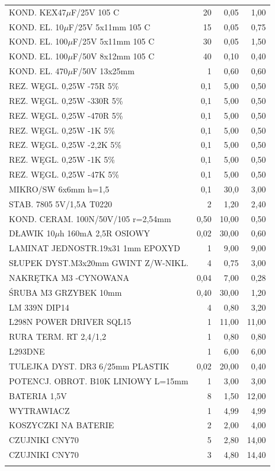 \documentclass[11pt,a4paper]{article}
\begin{document}
\begin{longtable}{|l|r|r|r|}
  KOND. KEX47$\mu$F/25V 105 C & 20 & 0,05 & 1,00 \\
  KOND. EL. 10$\mu$F/25V 5x11mm 105 C & 15 & 0,05 & 0,75 \\
  KOND. EL. 100$\mu$F/25V 5x11mm 105 C & 30 & 0,05 & 1,50 \\   
  KOND. EL. 100$\mu$F/50V 8x12mm 105 C & 40 & 0,10 & 0,40 \\ 
  KOND. EL. 470$\mu$F/50V 13x25mm & 1 & 0,60 & 0,60 \\ 
  REZ. WĘGL. 0,25W -75R 5\% & 0,1 & 5,00 & 0,50 \\
  REZ. WĘGL. 0,25W -330R 5\% & 0,1 & 5,00 & 0,50 \\
  REZ. WĘGL. 0,25W -470R 5\% & 0,1 & 5,00 & 0,50 \\
  REZ. WĘGL. 0,25W -1K 5\% & 0,1 & 5,00 & 0,50 \\
  REZ. WĘGL. 0,25W -2,2K 5\% & 0,1 & 5,00 & 0,50 \\
  REZ. WĘGL. 0,25W -1K 5\% & 0,1 & 5,00 & 0,50 \\
  REZ. WĘGL. 0,25W -47K 5\% & 0,1 & 5,00 & 0,50 \\
  MIKRO/SW 6x6mm h=1,5 & 0,1 & 30,0 & 3,00 \\
  STAB. 7805 5V/1,5A T0220 & 2 & 1,20 & 2,40 \\
  KOND. CERAM. 100N/50V/105 r=2,54mm & 0,50 & 10,00 & 0,50 \\
  DŁAWIK 10$\mu$h 160mA 2,5R OSIOWY & 0,02 & 30,00 & 0,60 \\
  LAMINAT JEDNOSTR.19x31 1mm EPOXYD & 1 & 9,00 & 9,00 \\
  SŁUPEK DYST.M3x20mm GWINT Z/W-NIKL. & 4 & 0,75 & 3,00 \\
  NAKRĘTKA M3 -CYNOWANA & 0,04 & 7,00 & 0,28 \\
  ŚRUBA M3 GRZYBEK 10mm & 0,40 & 30,00 & 1,20 \\
  LM 339N DIP14 & 4 & 0,80 & 3,20 \\
  L298N POWER DRIVER SQL15 & 1 & 11,00 & 11,00 \\
  RURA TERM. RT 2,4/1,2 & 1 & 0,80 & 0,80 \\
  L293DNE & 1 & 6,00 & 6,00 \\
  TULEJKA DYST. DR3 6/25mm PLASTIK & 0,02 & 20,00 & 0,40 \\
  POTENCJ. OBROT. B10K LINIOWY L=15mm & 1 & 3,00 & 3,00 \\
  BATERIA 1,5V & 8 & 1,50 & 12,00 \\
  WYTRAWIACZ & 1 & 4,99 & 4,99 \\
  KOSZYCZKI NA BATERIE & 2 & 2,00 & 4,00 \\      
  CZUJNIKI CNY70 & 5 & 2,80 & 14,00 \\ 
  CZUJNIKI CNY70 & 3 & 4,80 & 14,40 \\ 
   &  &  &  \\        
  \hline
\end{longtable}
\restoregeometry
\end{document}
